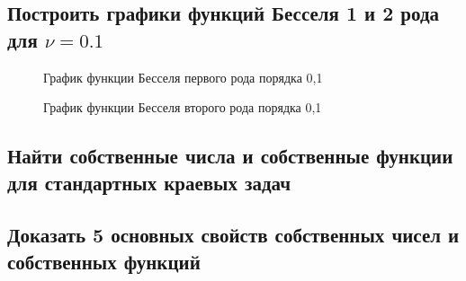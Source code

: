 \documentclass[12pt, a4paper]{report}
\begin{document}
\subsection{Построить графики функций Бесселя 1 и 2 рода для $\nu = 0.1$}
\begin{figure}[H]
	\caption{График функции Бесселя первого рода порядка 0,1}
\end{figure}

\begin{figure}[H]
	\caption{График функции Бесселя второго рода порядка 0,1}
\end{figure}

\subsection{Найти собственные числа и собственные функции для стандартных краевых задач}
\subsection{Доказать 5 основных свойств собственных чисел и собственных функций}
\end{document}
